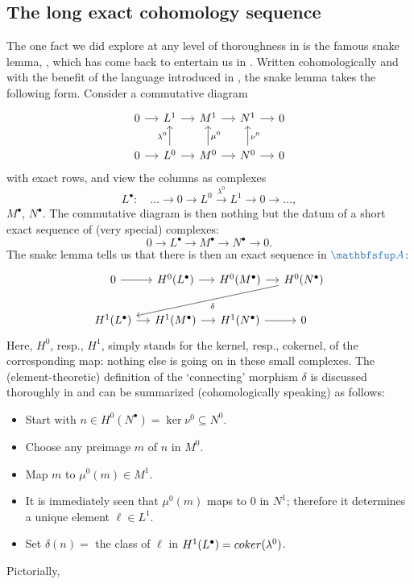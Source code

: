 \subsection{The long exact cohomology sequence}
\label{subsec:homol:the-long-exact-cohomology-sequence}

The one fact we did explore at any level of thoroughness in
 is the famous
snake lemma, , which has come back to
entertain us in . Written
cohomologically and with the benefit of the language introduced in
, the snake lemma
takes the following form. Consider a commutative diagram
\[\begin{tikzcd}[column sep=small]
    0 \arrow[r] & L^1 \arrow[r] & M^1 \arrow[r] & N^1 \arrow[r] & 0 \\
    0 \arrow[r] & L^0 \arrow[r] \arrow[u, "\lambda^0"] & M^0 \arrow[r]
    \arrow[u, "\mu^0"'] & N^0 \arrow[r] \arrow[u, "\nu^0"'] & 0
  \end{tikzcd}\] with exact rows, and view the columns as complexes
\[
  L^\bullet : \quad \dots \longrightarrow 0 \longrightarrow L^0
  \xrightarrow{\lambda^0} L^1 \longrightarrow 0 \longrightarrow \dots,
\]
$M^\bullet$, $N^\bullet$. The commutative diagram is then nothing but
the datum of a short exact sequence of (very special) complexes:
\[
  0 \longrightarrow L^\bullet \longrightarrow M^\bullet
  \longrightarrow N^\bullet \longrightarrow 0.
\]
The snake lemma tells us that there is then an exact sequence in
$\categ{A}$:
\[\begin{tikzcd}[column sep=small]
    0 \arrow[r] & H^0(L^\bullet) \arrow[r] & H^0(M^\bullet) \arrow[r]
    &
    H^0(N^\bullet) \\
    H^1(L^\bullet) \arrow[r] & H^1(M^\bullet) \arrow[r] &
    H^1(N^\bullet) \arrow[r] & 0 \arrow[from=1-4, to=2-1, "\delta"]
  \end{tikzcd}\] Here, $H^0$, resp., $H^1$, simply stands for the
kernel, resp., cokernel, of the corresponding map: nothing else is
going on in these small complexes. The (element-theoretic) definition
of the `connecting' morphism $\delta$ is discussed thoroughly in
 and can be
summarized (cohomologically speaking) as follows:
\begin{itemize}
\item Start with $n \in H^0(N^\bullet) = \ker\nu^0 \subseteq N^0$.
\item Choose any preimage $m$ of $n$ in $M^0$.
\item Map $m$ to $\mu^0(m) \in M^1$.
\item It is immediately seen that $\mu^0(m)$ maps to $0$ in $N^1$;
  therefore it determines a unique element $\ell \in L^1$.
\item Set $\delta(n) = $ the class of $\ell$ in
  $H^1(L^\bullet) = coker(\lambda^0)$.
\end{itemize}
Pictorially,

